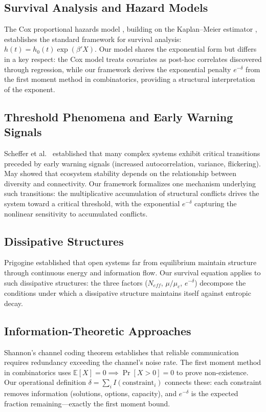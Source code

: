 \documentclass[11pt,a4paper]{article}
\begin{document}
\subsection{Survival Analysis and Hazard Models}

The Cox proportional hazards model \citep{cox1972}, building on the Kaplan--Meier estimator \citep{kaplan1958}, establishes the standard framework for survival analysis: $h(t) = h_0(t) \exp(\beta' X)$. Our model shares the exponential form but differs in a key respect: the Cox model treats covariates as post-hoc correlates discovered through regression, while our framework derives the exponential penalty $e^{-\delta}$ from the first moment method in combinatorics, providing a structural interpretation of the exponent.

\subsection{Threshold Phenomena and Early Warning Signals}

Scheffer et al.\ \citep{scheffer2009} established that many complex systems exhibit critical transitions preceded by early warning signals (increased autocorrelation, variance, flickering). May \citep{may1972} showed that ecosystem stability depends on the relationship between diversity and connectivity. Our framework formalizes one mechanism underlying such transitions: the multiplicative accumulation of structural conflicts drives the system toward a critical threshold, with the exponential $e^{-\delta}$ capturing the nonlinear sensitivity to accumulated conflicts.

\subsection{Dissipative Structures}

Prigogine \citep{prigogine1984} established that open systems far from equilibrium maintain structure through continuous energy and information flow. Our survival equation applies to such dissipative structures: the three factors ($N_{eff}$, $\mu/\mu_c$, $e^{-\delta}$) decompose the conditions under which a dissipative structure maintains itself against entropic decay.

\subsection{Information-Theoretic Approaches}

Shannon's channel coding theorem \citep{shannon1948,cover2006} establishes that reliable communication requires redundancy exceeding the channel's noise rate. The first moment method in combinatorics \citep{alon2016} uses $\mathbb{E}[X] = 0 \implies \Pr[X > 0] = 0$ to prove non-existence. Our operational definition $\delta = \sum_i I(\text{constraint}_i)$ connects these: each constraint removes information (solutions, options, capacity), and $e^{-\delta}$ is the expected fraction remaining---exactly the first moment bound.
\end{document}
